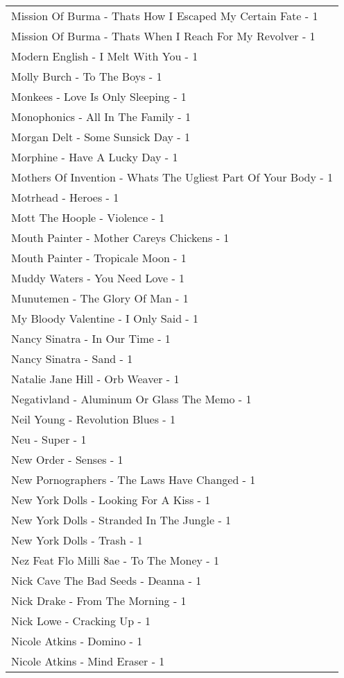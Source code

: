 \documentclass[
]{article}
\begin{document}
\begin{longtable}{l}
Mission Of Burma - Thats How I Escaped My Certain Fate - 1 \\ 
Mission Of Burma - Thats When I Reach For My Revolver - 1 \\ 
Modern English - I Melt With You - 1 \\ 
Molly Burch - To The Boys - 1 \\ 
Monkees - Love Is Only Sleeping - 1 \\ 
Monophonics - All In The Family - 1 \\ 
Morgan Delt - Some Sunsick Day - 1 \\ 
Morphine - Have A Lucky Day - 1 \\ 
Mothers Of Invention - Whats The Ugliest Part Of Your Body - 1 \\ 
Motrhead - Heroes - 1 \\ 
Mott The Hoople - Violence - 1 \\ 
Mouth Painter - Mother Careys Chickens - 1 \\ 
Mouth Painter - Tropicale Moon - 1 \\ 
Muddy Waters - You Need Love - 1 \\ 
Munutemen - The Glory Of Man - 1 \\ 
My Bloody Valentine - I Only Said - 1 \\ 
Nancy Sinatra - In Our Time - 1 \\ 
Nancy Sinatra - Sand - 1 \\ 
Natalie Jane Hill - Orb Weaver - 1 \\ 
Negativland - Aluminum Or Glass The Memo - 1 \\ 
Neil Young - Revolution Blues - 1 \\ 
Neu - Super - 1 \\ 
New Order - Senses - 1 \\ 
New Pornographers - The Laws Have Changed - 1 \\ 
New York Dolls - Looking For A Kiss - 1 \\ 
New York Dolls - Stranded In The Jungle - 1 \\ 
New York Dolls - Trash - 1 \\ 
Nez Feat Flo Milli 8ae - To The Money - 1 \\ 
Nick Cave The Bad Seeds - Deanna - 1 \\ 
Nick Drake - From The Morning - 1 \\ 
Nick Lowe - Cracking Up - 1 \\ 
Nicole Atkins - Domino - 1 \\ 
Nicole Atkins - Mind Eraser - 1 \\ 

\end{longtable}
\end{document}
